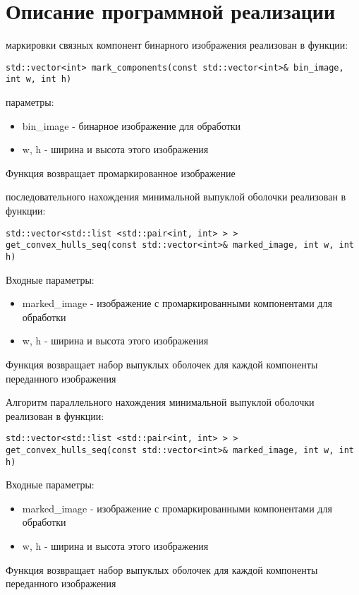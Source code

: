 \documentclass{report}
\begin{document}
\section*{Описание программной реализации}
 маркировки связных компонент бинарного изображения реализован в функции:
\begin{lstlisting}
std::vector<int> mark_components(const std::vector<int>& bin_image, int w, int h)
\end{lstlisting}
 параметры:
\begin{itemize}
\item bin\_image - бинарное изображение для обработки
\item w, h - ширина и высота этого изображения
\end{itemize}
\par Функция возвращает промаркированное изображение

 последовательного нахождения минимальной выпуклой оболочки реализован в функции:
\begin{lstlisting}
std::vector<std::list <std::pair<int, int> > > get_convex_hulls_seq(const std::vector<int>& marked_image, int w, int h)
\end{lstlisting}
\par Входные параметры:
\begin{itemize}
\item marked\_image - изображение с промаркированными компонентами для обработки
\item w, h - ширина и высота этого изображения
\end{itemize}
\par Функция возвращает набор выпуклых оболочек для каждой компоненты переданного изображения

\par Алгоритм параллельного нахождения минимальной выпуклой оболочки реализован в функции:
\begin{lstlisting}
std::vector<std::list <std::pair<int, int> > > get_convex_hulls_seq(const std::vector<int>& marked_image, int w, int h)
\end{lstlisting}
\par Входные параметры:
\begin{itemize}
\item marked\_image - изображение с промаркированными компонентами для обработки
\item w, h - ширина и высота этого изображения
\end{itemize}
\par Функция возвращает набор выпуклых оболочек для каждой компоненты переданного изображения
\end{document}
